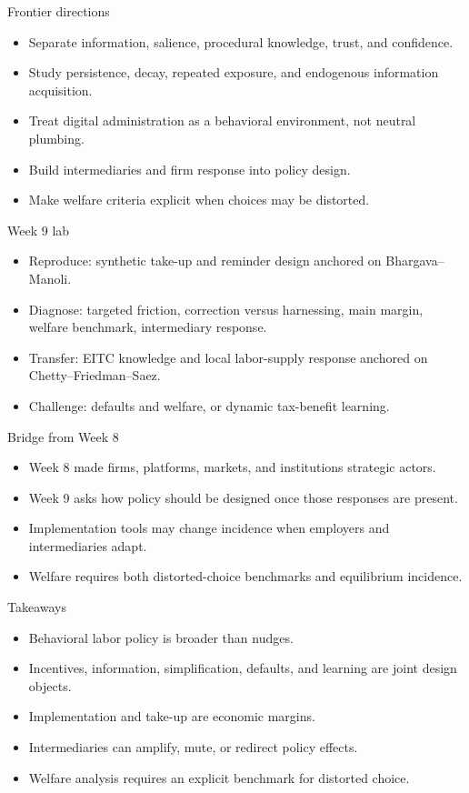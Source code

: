 \documentclass[aspectratio=169,11pt]{beamer}
\begin{document}
\begin{frame}{Frontier directions}
\begin{itemize}
    \item Separate information, salience, procedural knowledge, trust, and confidence.
    \item Study persistence, decay, repeated exposure, and endogenous information acquisition.
    \item Treat digital administration as a behavioral environment, not neutral plumbing.
    \item Build intermediaries and firm response into policy design.
    \item Make welfare criteria explicit when choices may be distorted.
\end{itemize}
\end{frame}

\begin{frame}{Week 9 lab}
\begin{itemize}
    \item Reproduce: synthetic take-up and reminder design anchored on Bhargava--Manoli.
    \item Diagnose: targeted friction, correction versus harnessing, main margin, welfare benchmark, intermediary response.
    \item Transfer: EITC knowledge and local labor-supply response anchored on Chetty--Friedman--Saez.
    \item Challenge: defaults and welfare, or dynamic tax-benefit learning.
\end{itemize}
\end{frame}

\begin{frame}{Bridge from Week 8}
\begin{itemize}
    \item Week 8 made firms, platforms, markets, and institutions strategic actors.
    \item Week 9 asks how policy should be designed once those responses are present.
    \item Implementation tools may change incidence when employers and intermediaries adapt.
    \item Welfare requires both distorted-choice benchmarks and equilibrium incidence.
\end{itemize}
\end{frame}

\begin{frame}{Takeaways}
\begin{itemize}
    \item Behavioral labor policy is broader than nudges.
    \item Incentives, information, simplification, defaults, and learning are joint design objects.
    \item Implementation and take-up are economic margins.
    \item Intermediaries can amplify, mute, or redirect policy effects.
    \item Welfare analysis requires an explicit benchmark for distorted choice.
\end{itemize}
\end{frame}
\end{document}
